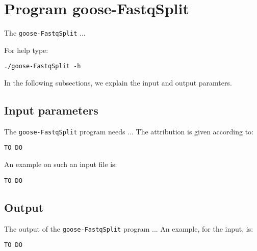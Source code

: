 \section{Program goose-FastqSplit}
The \texttt{goose-FastqSplit} ...

For help type:
\begin{lstlisting}
./goose-FastqSplit -h
\end{lstlisting}
In the following subsections, we explain the input and output paramters.

\subsection*{Input parameters}

The \texttt{goose-FastqSplit} program needs ...
The attribution is given according to:
\begin{lstlisting}
TO DO
\end{lstlisting}

An example on such an input file is:
\begin{lstlisting}
TO DO
\end{lstlisting}

\subsection*{Output}
The output of the \texttt{goose-FastqSplit} program ...
An example, for the input, is:
\begin{lstlisting}
TO DO
\end{lstlisting}

